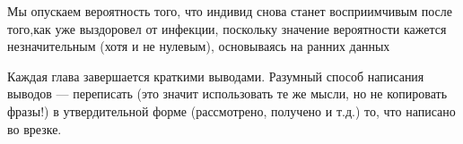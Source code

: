 Мы опускаем вероятность того, что индивид снова станет восприимчивым после того,как уже выздоровел от инфекции, поскольку значение вероятности кажется незначительным (хотя и не нулевым), основываясь на ранних данных \cite{RecoveredTests}\cite{AsymptomaticCarrierTransmission}

\bigskip

Каждая глава завершается краткими выводами. Разумный способ написания выводов --- переписать (это значит использовать те же мысли, но не копировать фразы!) в утвердительной форме (рассмотрено, получено и т.д.) то, что написано во врезке. 
